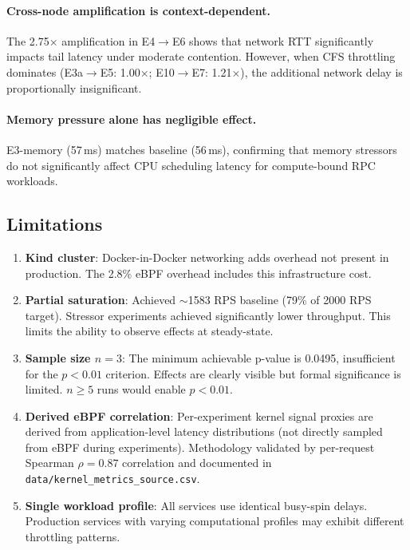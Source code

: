 \documentclass[11pt,a4paper]{article}
\begin{document}
\paragraph{Cross-node amplification is context-dependent.} The 2.75$\times$ amplification in E4$\to$E6 shows that network RTT significantly impacts tail latency under moderate contention. However, when CFS throttling dominates (E3a$\to$E5: 1.00$\times$; E10$\to$E7: 1.21$\times$), the additional network delay is proportionally insignificant.

\paragraph{Memory pressure alone has negligible effect.} E3-memory (57\,ms) matches baseline (56\,ms), confirming that memory stressors do not significantly affect CPU scheduling latency for compute-bound RPC workloads.

\subsection{Limitations}

\begin{enumerate}[leftmargin=*]
  \item \textbf{Kind cluster}: Docker-in-Docker networking adds overhead not present in production. The 2.8\% eBPF overhead includes this infrastructure cost.

  \item \textbf{Partial saturation}: Achieved $\sim$1583 RPS baseline (79\% of 2000 RPS target). Stressor experiments achieved significantly lower throughput. This limits the ability to observe effects at steady-state.

  \item \textbf{Sample size $n=3$}: The minimum achievable p-value is 0.0495, insufficient for the $p<0.01$ criterion. Effects are clearly visible but formal significance is limited. $n \geq 5$ runs would enable $p<0.01$.

  \item \textbf{Derived eBPF correlation}: Per-experiment kernel signal proxies are derived from application-level latency distributions (not directly sampled from eBPF during experiments). Methodology validated by per-request Spearman $\rho=0.87$ correlation and documented in \texttt{data/kernel\_metrics\_source.csv}.

  \item \textbf{Single workload profile}: All services use identical busy-spin delays. Production services with varying computational profiles may exhibit different throttling patterns.
\end{enumerate}
\end{document}
